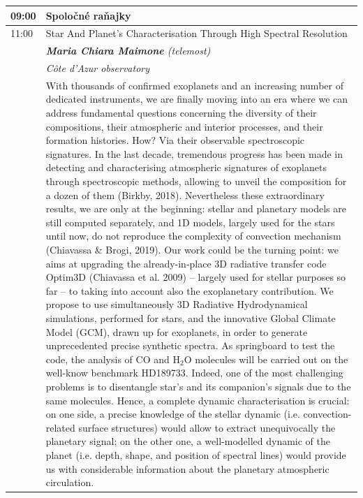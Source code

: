 \documentclass[a4paper]{report}
\begin{document}
        \begin{tabularx}{\textwidth}{>{}p{2cm} >{\RaggedRight}X}
            \toprule
                            {\Large 09:00} & {\Large Spoločné raňajky} \\
                                                                                \midrule                            {\Large 11:00} & {\Large Star And Planet’s Characterisation Through High Spectral Resolution} \\
                                            & \textit{\textbf{Maria Chiara Maimone} (telemost)} \\
                                                                & \textit{Côte d’Azur observatory} \\
                                                                & With thousands of confirmed exoplanets and an increasing number of dedicated instruments, we are finally moving into an era where we can address fundamental questions concerning the diversity of their compositions, their atmospheric and interior processes, and their formation histories. How? Via their observable spectroscopic signatures. In the last decade, tremendous progress has been made in detecting and characterising atmospheric signatures of exoplanets through spectroscopic methods, allowing to unveil the composition for a dozen of them (Birkby, 2018).
Nevertheless these extraordinary results, we are only at the beginning: stellar and planetary models are still computed separately, and 1D models, largely used for the stars until now, do not reproduce the complexity of convection mechanism (Chiavassa \& Brogi, 2019). Our work could be the turning point: we aims at upgrading the already-in-place 3D radiative transfer code Optim3D (Chiavassa et al. 2009) -- largely used for stellar purposes so far -- to taking into account also the exoplanetary contribution. We propose to use simultaneously 3D Radiative Hydrodynamical simulations, performed for stars, and the innovative Global Climate Model (GCM), drawn up for exoplanets, in order to generate unprecedented precise synthetic spectra. As springboard to test the code, the analysis of CO and $\mathrm{H}_2\mathrm{O}$ molecules will be carried out on the well-know benchmark HD189733. Indeed, one of the most challenging problems is to disentangle star’s and its companion’s signals due to the same molecules. Hence, a complete dynamic characterisation is crucial: on one side, a precise knowledge of the stellar dynamic (i.e. convection-related surface structures) would allow to extract unequivocally the planetary signal; on the other one, a well-modelled dynamic of the planet (i.e. depth, shape, and position of spectral lines) would provide us with considerable information about the planetary atmospheric circulation.
 \\
                                                                \bottomrule
        \end{tabularx}
\end{document}
